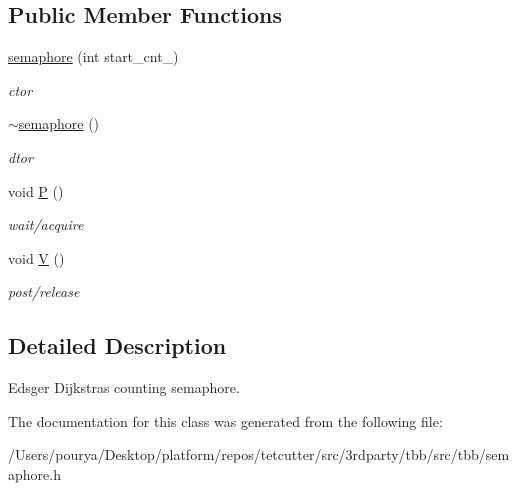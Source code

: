 \subsection*{Public Member Functions}
\begin{DoxyCompactItemize}
\item 
\hypertarget{classtbb_1_1internal_1_1semaphore_a05c4701a0cf9c6f4e2c35a4be1582706}{}\hyperlink{classtbb_1_1internal_1_1semaphore_a05c4701a0cf9c6f4e2c35a4be1582706}{semaphore} (int start\+\_\+cnt\+\_)\label{classtbb_1_1internal_1_1semaphore_a05c4701a0cf9c6f4e2c35a4be1582706}

\begin{DoxyCompactList}\small\item\em ctor \end{DoxyCompactList}\item 
\hypertarget{classtbb_1_1internal_1_1semaphore_a4bb4af6dc2e1fc0d01ec2c78e4d58cc3}{}\hyperlink{classtbb_1_1internal_1_1semaphore_a4bb4af6dc2e1fc0d01ec2c78e4d58cc3}{$\sim$semaphore} ()\label{classtbb_1_1internal_1_1semaphore_a4bb4af6dc2e1fc0d01ec2c78e4d58cc3}

\begin{DoxyCompactList}\small\item\em dtor \end{DoxyCompactList}\item 
\hypertarget{classtbb_1_1internal_1_1semaphore_aa48d61f1792cffc3d2ea15506078e7c0}{}void \hyperlink{classtbb_1_1internal_1_1semaphore_aa48d61f1792cffc3d2ea15506078e7c0}{P} ()\label{classtbb_1_1internal_1_1semaphore_aa48d61f1792cffc3d2ea15506078e7c0}

\begin{DoxyCompactList}\small\item\em wait/acquire \end{DoxyCompactList}\item 
\hypertarget{classtbb_1_1internal_1_1semaphore_ab9d71af0a85d60e19f351be973a983a4}{}void \hyperlink{classtbb_1_1internal_1_1semaphore_ab9d71af0a85d60e19f351be973a983a4}{V} ()\label{classtbb_1_1internal_1_1semaphore_ab9d71af0a85d60e19f351be973a983a4}

\begin{DoxyCompactList}\small\item\em post/release \end{DoxyCompactList}\end{DoxyCompactItemize}


\subsection{Detailed Description}
Edsger Dijkstra\textquotesingle{}s counting semaphore. 

The documentation for this class was generated from the following file\+:\begin{DoxyCompactItemize}
\item 
/\+Users/pourya/\+Desktop/platform/repos/tetcutter/src/3rdparty/tbb/src/tbb/semaphore.\+h\end{DoxyCompactItemize}
